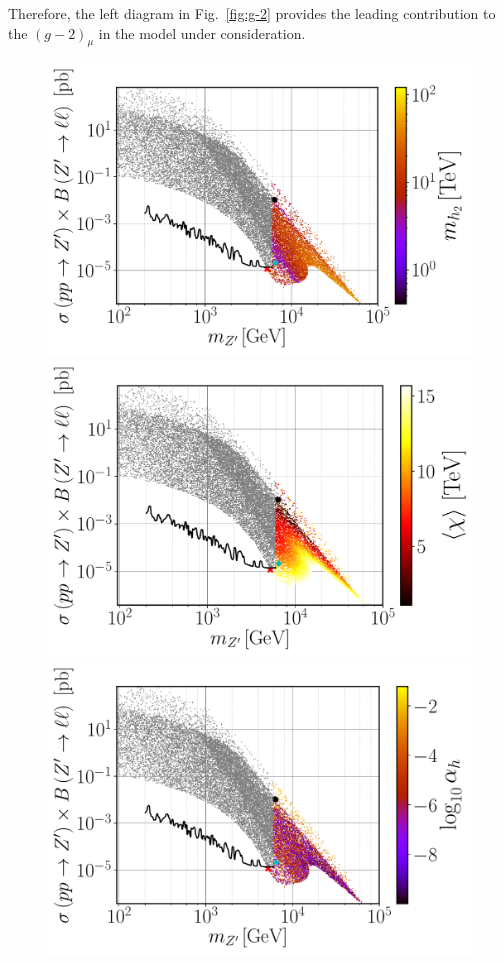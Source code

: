 \documentclass[10pt]{report}
\begin{document}
Therefore, the left diagram in Fig.~\ref{fig:g-2} provides the leading contribution to the $\left(g-2\right)_\mu$ in the model under consideration.
\begin{figure}[!htb]
	\centering
	\includegraphics[scale=0.37]{Images/BLSM_2/mZp_Xsec_mh2.pdf}
	\includegraphics[scale=0.37]{Images/BLSM_2/mZp_Xsec_VEV.pdf}
	\includegraphics[scale=0.37]{Images/BLSM_2/mZp_Xsec_alpha.pdf}	

\end{figure}
\end{document}
